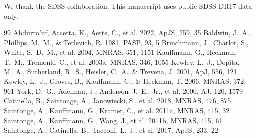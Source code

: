 \documentclass[twocolumn]{aastex631}
\begin{document}
\begin{acknowledgments}
We thank the SDSS collaboration. This manuscript uses public SDSS DR17 data only.
\end{acknowledgments}
\begin{thebibliography}{99}
 Abdurro'uf, Accetta, K., Aerts, C., et al. 2022, ApJS, 259, 35
 Baldwin, J.~A., Phillips, M.~M., \& Terlevich, R. 1981, PASP, 93, 5
 Brinchmann, J., Charlot, S., White, S.~D.~M., et al. 2004, MNRAS, 351, 1151
 Kauffmann, G., Heckman, T.~M., Tremonti, C., et al. 2003a, MNRAS, 346, 1055
 Kewley, L.~J., Dopita, M.~A., Sutherland, R.~S., Heisler, C.~A., \& Trevena, J. 2001, ApJ, 556, 121
 Kewley, L.~J., Groves, B., Kauffmann, G., \& Heckman, T. 2006, MNRAS, 372, 961
 York, D.~G., Adelman, J., Anderson, J.~E., Jr., et al. 2000, AJ, 120, 1579
 Catinella, B., Saintonge, A., Janowiecki, S., et al. 2018, MNRAS, 476, 875
 Saintonge, A., Kauffmann, G., Kramer, C., et al. 2011a, MNRAS, 415, 32
 Saintonge, A., Kauffmann, G., Wang, J., et al. 2011b, MNRAS, 415, 61
 Saintonge, A., Catinella, B., Tacconi, L.~J., et al. 2017, ApJS, 233, 22
\end{thebibliography}
\end{document}
